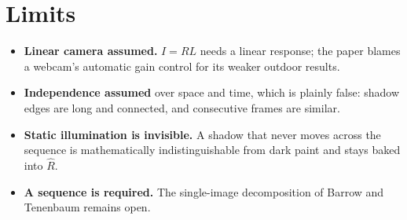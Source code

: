 \documentclass[11pt]{article}
\begin{document}
\section{Limits}

\begin{itemize}
  \item \textbf{Linear camera assumed.} $I=RL$ needs a linear response; the paper blames a webcam's automatic
        gain control for its weaker outdoor results.
  \item \textbf{Independence assumed} over space and time, which is plainly false: shadow edges are long and
        connected, and consecutive frames are similar.
  \item \textbf{Static illumination is invisible.} A shadow that never moves across the sequence is
        mathematically indistinguishable from dark paint and stays baked into $\hat R$.
  \item \textbf{A sequence is required.} The single-image decomposition of Barrow and Tenenbaum remains open.
\end{itemize}
\end{document}
